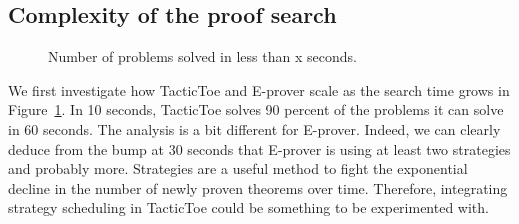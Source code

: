 \documentclass[runningheads,a4paper,draft]{svjour3}
\def\eprover{\textsf{E-prover}\xspace}
\def\tactictoe{\textsf{TacticToe}\xspace}
\begin{document}
\subsection{Complexity of the proof search}

\begin{figure}[h]
\centering
{}
\caption{\label{fig:c1} Number of problems solved in less than x seconds.}
\end{figure}

We first investigate how \tactictoe and \eprover scale as the search time
grows in Figure~\ref{fig:c1}.
In 10 seconds, \tactictoe solves 90 percent of the problems it can
solve in 60 seconds. The analysis is a bit different for \eprover. Indeed,
we can clearly deduce from the bump at 30 seconds that \eprover is using at
least two strategies and probably more. Strategies are a useful method to
fight the exponential decline in the number of newly proven theorems over
time. Therefore, integrating strategy scheduling in \tactictoe could be
something to be experimented with.

\end{document}
